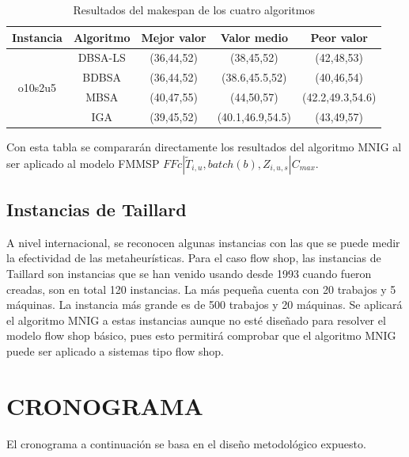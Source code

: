 \documentclass{article}
\def\notac_modelo{$FFc | \tilde{T}_{i, u}, batch(b), Z_{i, u, s} | C_{max}$}
\begin{document}
\begin{table}[h]
    \caption{Resultados del makespan de los cuatro algoritmos}
    \label{tab:algs}
    \begin{center}
    \begin{tabular}{ccccc}
        \hline
        Instancia & Algoritmo & Mejor valor & Valor medio & Peor valor\\
        \hline
        \multirow{4}{*}{o10s2u5} & DBSA-LS & (36,44,52) & (38,45,52) & (42,48,53)\\
         & BDBSA & (36,44,52) & (38.6,45.5,52) & (40,46,54)\\
         & MBSA & (40,47,55) & (44,50,57) & (42.2,49.3,54.6)\\
         & IGA & (39,45,52) & (40.1,46.9,54.5) & (43,49,57)\\
        \hline
    \end{tabular}
    \end{center}
\end{table}

Con esta tabla se compararán directamente los resultados del algoritmo MNIG al ser aplicado al modelo FMMSP \notac_modelo.

\subsection{Instancias de Taillard}

A nivel internacional, se reconocen algunas instancias con las que se puede medir la efectividad de las metaheurísticas. Para el caso flow shop, las instancias de Taillard son instancias que se han venido usando desde 1993 cuando fueron creadas, son en total 120 instancias. La más pequeña cuenta con 20 trabajos y 5 máquinas. La instancia más grande es de 500 trabajos y 20 máquinas. Se aplicará el algoritmo MNIG a estas instancias aunque no esté diseñado para resolver el modelo flow shop básico, pues esto permitirá comprobar que el algoritmo MNIG puede ser aplicado a sistemas tipo flow shop.

\section{CRONOGRAMA}

El cronograma a continuación se basa en el diseño metodológico expuesto.
\end{document}

